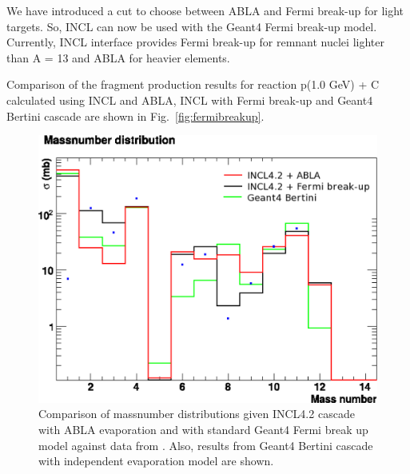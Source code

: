 \documentclass[a4paper]{jpconf}
\begin{document}



We have introduced a cut to choose between ABLA and Fermi break-up for light targets.
So, INCL can now be used with the Geant4 Fermi break-up model.
Currently, INCL interface provides Fermi break-up \cite{g4incl} for
remnant nuclei lighter than A = 13 and ABLA for heavier elements.

Comparison of the fragment production results for reaction p(1.0 GeV)
+ C calculated using INCL and ABLA, INCL with Fermi break-up and
Geant4 Bertini cascade are shown in Fig.~\ref{fig:fermibreakup}.



\begin{figure}[h]
\begin{minipage}{9.0cm}
\includegraphics[width=1.0\textwidth]{poster/images/masses2.eps}
\end{minipage}\hspace{2pc}%
\begin{minipage}{6cm}
\caption{Comparison of massnumber distributions given INCL4.2 cascade with ABLA evaporation 
and with standard Geant4 Fermi break up model against data from \cite{a}.
Also, results from Geant4 Bertini cascade with independent evaporation model are shown. }
\end{minipage} 
\end{figure}
\end{document}
